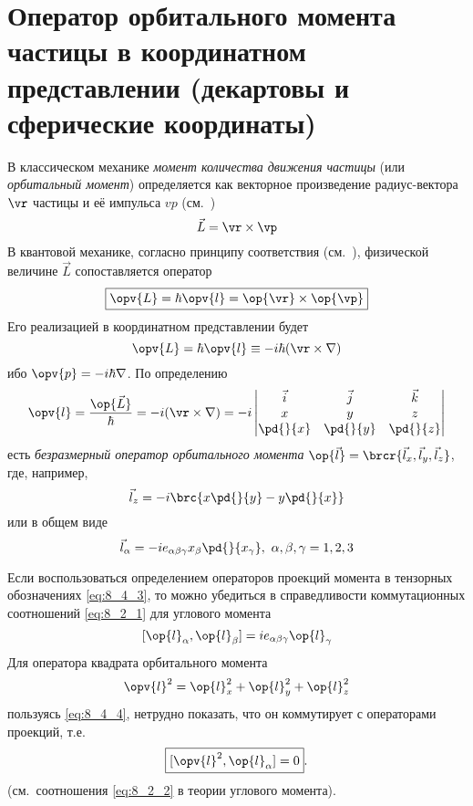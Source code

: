 \section{Оператор орбитального момента частицы в координатном представлении (декартовы и сферические координаты)}

В классическом механике {\em момент количества движения частицы} (или {\em орбитальный момент}) определяется как векторное произведение радиус-вектора $\vr$ частицы и её импульса $vp$ (см.~)
$$
\vec{L} = \vr \times \vp
$$%
%
В квантовой механике, согласно принципу соответствия (см.~), физической величине $\vec{L}$ сопоставляется оператор
\begin{equation}
\label{eq:8_4_1}
\boxed{
  \opv{L} = \hbar \opv{l} = \op{\vr} \times \op{\vp}
}
\end{equation}%
%
Его реализацией в координатном представлении будет
\begin{equation}
\label{eq:8_4_2}
  \opv{L} = \hbar \opv{l} \equiv -i\hbar(\vr \times \nabla)
\end{equation}%
%
ибо $\opv{p} = -i\hbar\nabla$. По определению
$$
\opv{l} = \frac{\op{\vec L}}{\hbar} = -i(\vr \times \nabla) = -i \left| 
  \begin{matrix}
  \vec{i} & \vec{j} & \vec{k}\\
  x & y & z\\
  \pd{}{x} & \pd{}{y} & \pd{}{z}\\
  \end{matrix}
  \right |
$$%
%
есть {\em безразмерный оператор орбитального момента} $\op{\vec l} = \brcr{\vec{l}_x, \vec{l}_y, \vec{l}_z}$, где, например,
$$
  \vec{l}_z = -i \brc{x \pd{}{y} - y \pd{}{x}}
$$%
%
или в общем виде
\begin{equation}
\label{eq:8_4_3}
  \vec{l}_\alpha = -i e_{\alpha \beta \gamma} x_\beta \pd{}{x_\gamma},~\alpha, \beta, \gamma = 1, 2, 3
\end{equation}

Если воспользоваться определением операторов проекций момента в тензорных обозначениях \eqref{eq:8_4_3}, то можно убедиться в справедливости коммутационных соотношений \eqref{eq:8_2_1} для углового момента
\begin{equation}
\label{eq:8_4_4}
  [\op{l}_\alpha, \op{l}_\beta] = i e_{\alpha \beta \gamma} \op{l}_\gamma
\end{equation}%
%
Для оператора квадрата орбитального момента
$$
\opv{l}^2 = \op{l}^2_x + \op{l}^2_y + \op{l}^2_z
$$%
%
пользуясь \eqref{eq:8_4_4}, нетрудно показать, что он коммутирует с операторами проекций, т.е.
\begin{equation}
\label{eq:8_4_5}
  \boxed{[\opv{l}^2, \op{l}_\alpha] = 0}.
\end{equation}%
%
(см.~соотношения \eqref{eq:8_2_2} в теории углового момента).

